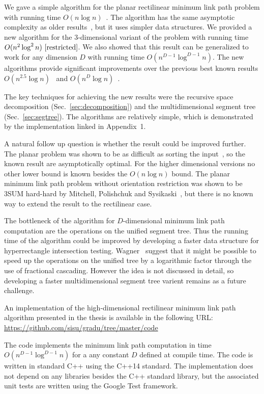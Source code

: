 \documentclass[english,gradu]{tktltiki2018}
\begin{document}
We gave a simple algorithm for the planar rectilinear minimum link path problem with running time $O(n\log n)$~\cite{revisited}.
The algorithm has the same asymptotic complexity as older results~\cite{dasnar,sato}, but it uses simpler data structures.
We provided a new algorithm for the 3-dimensional variant of the problem with running time $O(n^2\log^2 n)~\cite{restricted}$.
We also showed that this result can be generalized to work for any dimension $D$ with running time $O(n^{D-1}\log^{D-1}n)$.
The new algorithms provide significant improvements over the previous best known results $O(n^{2.5}\log n)$~\cite{wagner} and $O(n^D\log n)$~\cite{de1992}.

The key techniques for achieving the new results were the recursive space decomposition (Sec.~\ref{sec:decomposition}) and the multidimensional segment tree (Sec.~\ref{sec:segtree}).
The algorithms are relatively simple, which is demonstrated by the implementation linked in Appendix~1.

A natural follow up question is whether the result could be improved further.
The planar problem was shown to be as difficult as sorting the input~\cite{dasnar}, so the known result are asymptotically optimal.
For the higher dimensional versions no other lower bound is known besides the $O(n\log n)$ bound.
The planar minimum link path problem without orientation restriction was shown to be 3SUM hard-hard by Mitchell, Polishchuk and Sysikaski~\cite{revisited}, but there is no known way to extend the result to the rectilinear case.

The bottleneck of the algorithm for $D$-dimensional minimum link path computation are the operations on the unified segment tree.
Thus the running time of the algorithm could be improved by developing a faster data structure for hyperrectangle intersection testing.
Wagner~\cite{unified} suggest that it might be possible to speed up the operations on the unified tree by a logarithmic factor through the use of fractional cascading.
However the idea is not discussed in detail, so developing a faster multidimensional segment tree varient remains as a future challenge.



\nocite{*}



\lastpage

\appendices

\pagestyle{empty}

\label{apx:src}

An implementation of the high-dimensional rectilinear minimum link path algorithm presented in the thesis is available in the following URL: \\
\url{https://github.com/sisu/gradu/tree/master/code}

The code implements the minimum link path computation in time $O(n^{D-1}\log^{D-1}n)$ for a any constant $D$ defined at compile time.
The code is written in standard C++ using the C++14 standard.
The implementation does not depend on any libraries besides the C++ standard library, but the associated unit tests are written using the Google Test framework.
\end{document}
